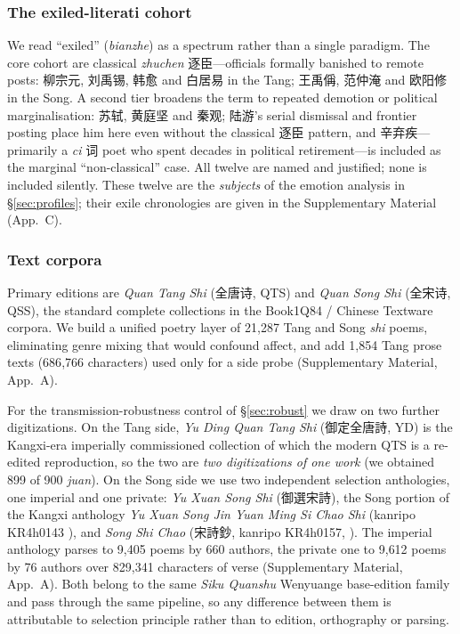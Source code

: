 \documentclass[10pt]{article}
\begin{document}
\subsubsection{The exiled-literati cohort}
\label{sec:cohort}
We read ``exiled'' (\emph{bianzhe}) as a spectrum rather than a single paradigm. The
core cohort are classical \emph{zhuchen} 逐臣---officials formally banished to remote
posts: 柳宗元, 刘禹锡, 韩愈 and 白居易 in the Tang; 王禹偁, 范仲淹 and 欧阳修 in the
Song. A second tier broadens the term to repeated demotion or political
marginalisation: 苏轼, 黄庭坚 and 秦观; 陆游's serial dismissal and frontier posting
place him here even without the classical 逐臣 pattern, and 辛弃疾---primarily a
\emph{ci} 词 poet who spent decades in political retirement---is included as the
marginal ``non-classical'' case. All twelve are named and justified; none is included
silently. These twelve are the \emph{subjects} of the emotion analysis in
\S\ref{sec:profiles}; their exile chronologies are given in the
Supplementary Material (App.~C).

\subsubsection{Text corpora}
\label{sec:corpus}
Primary editions are \emph{Quan Tang Shi} (全唐诗, QTS) and \emph{Quan Song Shi}
(全宋诗, QSS), the standard complete collections in the Book1Q84 / Chinese Textware
corpora. We build a unified poetry layer of 21{,}287 Tang and Song \emph{shi} poems,
eliminating genre mixing that would confound affect, and add 1{,}854 Tang prose texts
(686{,}766 characters) used only for a side probe (Supplementary Material, App.~A).

For the transmission-robustness control of \S\ref{sec:robust} we draw on two further
digitizations. On the Tang side, \emph{Yu Ding Quan Tang Shi} (御定全唐詩, YD) is the
Kangxi-era imperially commissioned collection of which the modern QTS is a re-edited
reproduction, so the two are \emph{two digitizations of one work} (we obtained 899 of
900 \emph{juan}). On the Song side we use two independent selection anthologies, one
imperial and one private: \emph{Yu Xuan Song Shi} (御選宋詩), the Song portion of the
Kangxi anthology \emph{Yu Xuan Song Jin Yuan Ming Si Chao Shi} (kanripo KR4h0143
\citealp{kangxi1709}), and \emph{Song Shi Chao} (宋詩鈔, kanripo KR4h0157,
\citealp{wu1671}). The imperial anthology parses to 9{,}405 poems by 660 authors, the
private one to 9{,}612 poems by 76 authors over 829{,}341 characters of verse (Supplementary Material, App.~A). Both belong to the same \emph{Siku Quanshu} Wenyuange
base-edition family and pass through the same pipeline, so any difference between them
is attributable to selection principle rather than to edition, orthography or parsing.
\end{document}
